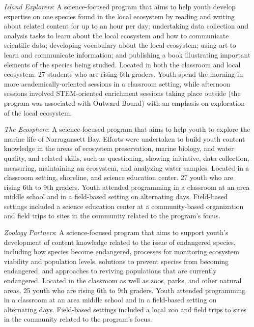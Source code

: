 \documentclass[]{msu-thesis}
\theoremstyle{definition}
\theoremstyle{definition}
\theoremstyle{definition}
\theoremstyle{remark}
\begin{document}
\emph{Island Explorers}: A science-focused program that aims to help
youth develop expertise on one species found in the local ecosystem by
reading and writing about related content for up to an hour per day;
undertaking data collection and analysis tasks to learn about the local
ecosystem and how to communicate scientific data; developing vocabulary
about the local ecosystem; using art to learn and communicate
information; and publishing a book illustrating important elements of
the species being studied. Located in both the classroom and local
ecosystem. 27 students who are rising 6th graders. Youth spend the
morning in more academically-oriented sessions in a classroom setting,
while afternoon sessions involved STEM-oriented enrichment sessions
taking place outside (the program was associated with Outward Bound)
with an emphasis on exploration of the local ecosystem.

\emph{The Ecosphere}: A science-focused program that aims to help youth
to explore the marine life of Narragansett Bay. Efforts were undertaken
to build youth content knowledge in the areas of ecosystem preservation,
marine biology, and water quality, and related skills, such as
questioning, showing initiative, data collection, measuring, maintaining
an ecosystem, and analyzing water samples. Located in a classroom
setting, shoreline, and science education center. 27 youth who are
rising 6th to 9th graders. Youth attended programming in a classroom at
an area middle school and in a field-based setting on alternating days.
Field-based settings included a science education center at a
community-based organization and field trips to sites in the community
related to the program's focus.

\emph{Zoology Partners}: A science-focused program that aims to support
youth's development of content knowledge related to the issue of
endangered species, including how species become endangered, processes
for monitoring ecosystem viability and population levels, solutions to
prevent species from becoming endangered, and approaches to reviving
populations that are currently endangered. Located in the classroom as
well as zoos, parks, and other natural areas. 25 youth who are rising
6th to 9th graders. Youth attended programming in a classroom at an area
middle school and in a field-based setting on alternating days.
Field-based settings included a local zoo and field trips to sites in
the community related to the program's focus.
\end{document}
